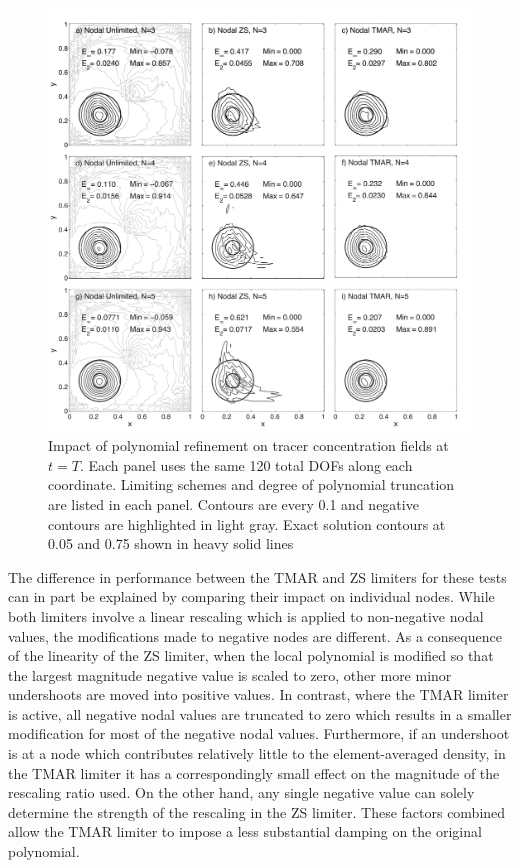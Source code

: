 \documentclass{ametsoc}
\begin{document}
\begin{figure} 
\includegraphics[width=\textwidth]{figs/2d/_defCosbell_9pan_pref.pdf}
\caption{Impact of polynomial refinement on tracer concentration fields at $t=T$. Each panel uses the same 120 total DOFs along each coordinate. Limiting schemes and degree of polynomial truncation are listed in each panel. Contours are every 0.1 and negative contours are highlighted in light gray. Exact solution contours at 0.05 and 0.75 shown in heavy solid lines}\label{fig:2dCosbellPref}
\end{figure}

The difference in performance between the TMAR and ZS limiters for these tests can in part be explained by comparing their impact on individual nodes. While both limiters involve a linear rescaling which is applied to non-negative nodal values, the modifications made to negative nodes are different. As a consequence of the linearity of the ZS limiter, when the local polynomial is modified so that the largest magnitude negative value is scaled to zero, other more minor undershoots are moved into positive values. In contrast, where the TMAR limiter is active, all negative nodal values are truncated to zero which results in a smaller modification for most of the negative nodal values. Furthermore, if an undershoot is at a node which contributes relatively little to the element-averaged density, in the TMAR limiter it has a correspondingly small effect on the magnitude of the rescaling ratio used. On the other hand, any single negative value can solely determine the strength of the rescaling in the ZS limiter. These factors combined allow the TMAR limiter to impose a less substantial damping on the original polynomial. 
\end{document}
